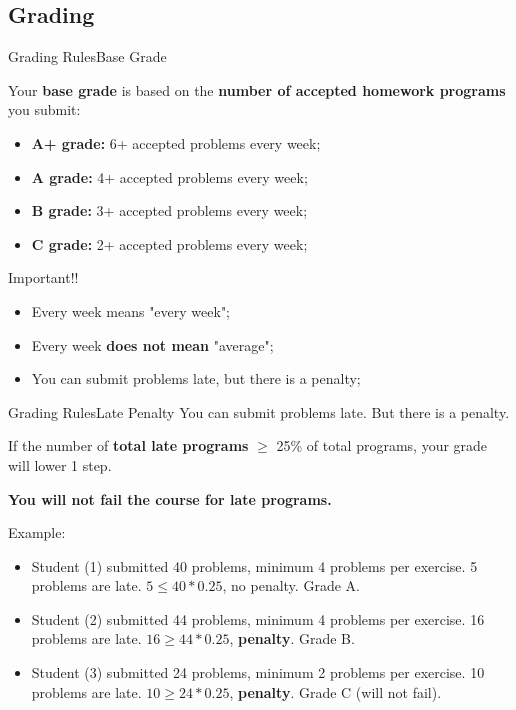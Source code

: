 \subsection{Grading}
\begin{frame}{Grading Rules}{Base Grade}

  Your {\bf base grade} is based on the {\bf number of accepted homework programs} you submit:

  \begin{itemize}
    \item {\bf A+ grade:} 6+ accepted problems every week;
    \item {\bf A grade:} 4+ accepted problems every week;
    \item {\bf B grade:} 3+ accepted problems every week;
    \item {\bf C grade:} 2+ accepted problems every week;
  \end{itemize}\bigskip

  \begin{alertblock}{Important!!}
    \begin{itemize}
      \item Every week means "every week";
      \item Every week {\bf does not mean} "average";
      \item You can submit problems late, but there is a penalty;
    \end{itemize}
  \end{alertblock}
\end{frame}

\begin{frame}{Grading Rules}{Late Penalty}
  You can submit problems late. But there is a penalty.\bigskip

  If the number of {\bf total late programs} $\ge$ 25\% of total programs, your grade will lower 1 step.\bigskip

  {\bf You will not fail the course for late programs.}

  \begin{exampleblock}{Example:}
    \begin{itemize}
      \item Student (1) submitted 40 problems, minimum 4 problems per exercise. 5 problems are late. $5 \le 40*0.25$, no penalty. Grade A.
      \item Student (2) submitted 44 problems, minimum 4 problems per exercise. 16 problems are late. $16 \ge 44*0.25$, {\bf penalty}. Grade B.
      \item Student (3) submitted 24 problems, minimum 2 problems per exercise. 10 problems are late. $10 \ge 24*0.25$, {\bf penalty}. Grade C (will not fail).
    \end{itemize}
  \end{exampleblock}
\end{frame}


